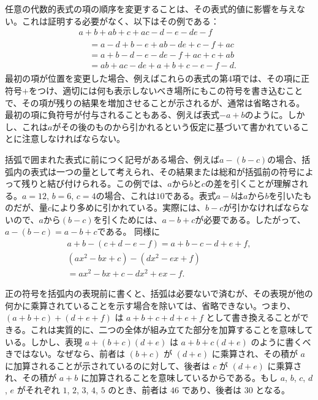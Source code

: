 \documentclass[a4paper,11pt,openany]{ltjsbook}
\begin{document}
任意の代数的表式の項の順序を変更することは、その表式的値に影響を与えない。これは証明する必要がなく、以下はその例である：
\begin{multline*}
a + b + ab + c + ac - d - e - de - f \\
\begin{aligned}
  &= a - d + b - e + ab - de + c - f + ac \\
  &= a + b - d - e - de - f + ac + c + ab \\
  &= ab + ac - de + a + b + c - e - f - d.
\end{aligned}
\end{multline*}
最初の項が位置を変更した場合、例えばこれらの表式の第4項では、その項に正符号$+$をつけ、適切には何も表示しないべき場所にもこの符号を書き込むことで、その項が残りの結果を増加させることが示されるが、通常は省略される。
最初の項に負符号が付与されることもある、例えば表式$-a + b$のように。しかし、これは$a$がその後のものから引かれるという仮定に基づいて書かれていることに注意しなければならない。

括弧で囲まれた表式に前につく記号がある場合、例えば$a - (b - c)$の場合、括弧内の表式は一つの量として考えられ、その結果または総和が括弧前の符号によって残りと結び付けられる。この例では、$a$から$b$と$c$の差を引くことが理解される。$a = 12$, $b = 6$, $c = 4$の場合、これは$10$である。表式$a - b$は$a$から$b$を引いたものだが、量$c$により多めに引かれている。実際には、$b - c$が引かなければならないので、$a$から$(b - c)$を引くためには、$a - b + c$が必要である。したがって、$a - (b - c) = a - b + c$である。
同様に
\begin{gather*}
a + b - (c + d - e - f) = a + b - c - d + e + f, \\
(ax^{2} - bx + c) - (dx^{2} - ex + f) \\
  = ax^{2} - bx + c - dx^{2} + ex - f.
\end{gather*}

正の符号を括弧内の表現前に書くと、括弧は必要ないで済むが、その表現が他の何かに乘算されていることを示す場合を除いては、省略できない。つまり、$(a + b + c) + (d + e + f)$ は $a + b + c + d + e + f$ として書き換えることができる。これは実質的に、二つの全体が組み立てた部分を加算することを意味している。しかし、表現 $a + (b + c)(d + e)$ は $a + b + c(d + e)$ のように書くべきではない。なぜなら、前者は $(b + c)$ が $(d + e)$ に乘算され、その積が $a$ に加算されることが示されているのに対して、後者は $c$ が $(d + e)$ に乘算され、その積が $a + b$ に加算されることを意味しているからである。もし $a$, $b$, $c$, $d$, $e$ がそれぞれ $1$, $2$, $3$, $4$, $5$ のとき、前者は $46$ であり、後者は $30$ となる。
\end{document}
